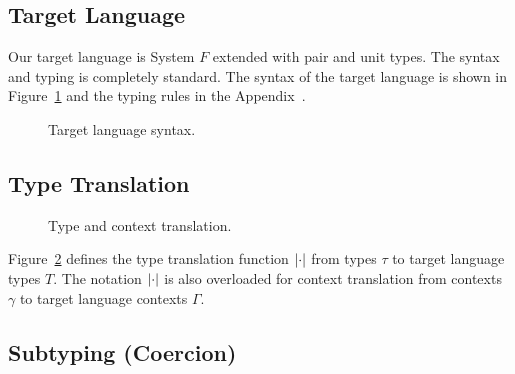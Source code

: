

\subsection{Target Language}

Our target language is System $F$ extended with pair and unit types. The syntax
and typing is completely standard. The syntax of the target language is shown in
Figure~\ref{fig:f-syntax} and the typing rules in the Appendix~.
\begin{figure}[h]
  
  \caption{Target language syntax.}
  \label{fig:f-syntax}
\end{figure}



\subsection{Type Translation}

\begin{figure}[h]


\caption{Type and context translation.}
\label{fig:type-and-context-translation}
\end{figure}

Figure~\ref{fig:type-and-context-translation} defines the type translation
function $\lvert \cdot \rvert$ from \name types $\tau$ to target language types $T$. The
notation $\lvert \cdot \rvert$ is also overloaded for context translation from \name
contexts $\gamma$ to target language contexts $\Gamma$.


\subsection{Subtyping (Coercion)}

